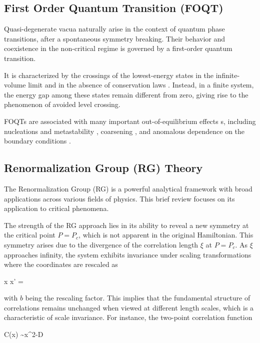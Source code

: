 \subsection{First Order Quantum Transition (FOQT)}
\label{FOQTeq}

Quasi-degenerate vacua naturally arise in the context of quantum phase transitions, after a spontaneous symmetry breaking. Their behavior and coexistence in the non-critical regime is governed by a first-order quantum transition.

It is characterized by the crossings of the lowest-energy states in the infinite-volume limit and in the absence of conservation laws \cite{plissetto2023scaling}.
Instead, in a finite system, the energy gap among these states remain different from zero, giving rise to the phenomenon of avoided level crossing.

FOQTs are associated with many important out-of-equilibrium effects s, including nucleations and metastability \cite{binder1987theory,bray2002theory}, coarsening \cite{chandran2012kibble}, and anomalous dependence on the boundary conditions \cite{pelissetto2020scaling,panagopoulos2018dynamic,campostrini2015quantum,pelissetto2018finite,rossini2018ground}.

\subsection{Renormalization Group (RG) Theory}

The Renormalization Group (RG) is a powerful analytical framework with broad applications across various fields of physics. This brief review focuses on its application to critical phenomena.

The strength of the RG approach lies in its ability to reveal a new symmetry at the critical point $ P = P_c $, which is not apparent in the original Hamiltonian. This symmetry arises due to the divergence of the correlation length $ \xi $ at $ P = P_c $. As $ \xi $ approaches infinity, the system exhibits invariance under scaling transformations where the coordinates are rescaled as 

x \rightarrow x' = 
\ea

with $ b $ being the rescaling factor. This implies that the fundamental structure of correlations remains unchanged when viewed at different length scales, which is a characteristic of scale invariance. For instance, the two-point correlation function 

C(x) \sim x^{2-D}
\ea

